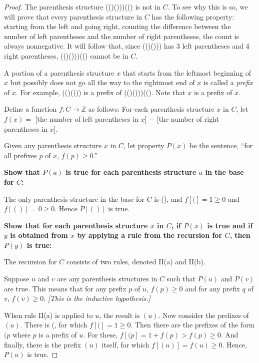 \documentclass[14pt]{extarticle}
\newcommand{\Z}{\mathbb{Z}}
\begin{document}
\begin{proof}
    The parenthesis structure (()()))(() is not in $C$. To see why this is so, we will prove that every parenthesis
    structure in $C$ has the following property: starting from the left and going right, counting the difference between
    the number of left parentheses and the number of right parentheses, the count is always nonnegative. It will
    follow that, since (()())) has 3 left parentheses and 4 right parentheses, (()()))(() cannot be in $C$.

    A portion of a parenthesis structure $x$ that starts from the leftmost beginning of $x$ but possibly does not go all
    the way to the rightmost end of $x$ is called a {\it prefix} of $x$. For example, (()())) is a prefix of (()()))((). Note that $x$ is a prefix of $x$.

    Define a function \(f: C \to \Z\) as follows: For each parenthesis structure $x$ in $C$, let \(f(x) = \)
    [the number of left parentheses in $x$] $-$ [the number of right parentheses in $x$].

    Given any parenthesis structure $x$ in $C$, let property $P(x)$ be the sentence, “for all prefixes $p$ of $x$, $f(p) \geq 0$.”

    {\bf Show that $P(a)$ is true for each parenthesis structure $a$ in the base for $C$:}

    The only parenthesis structure in the base for $C$ is (), and $f[(] = 1 \geq 0$ and $f[()] = 0 \geq 0$. Hence $P[()]$ is true.

        {\bf Show that for each parenthesis structure $x$ in $C$, if $P(x)$ is true and if $y$ is obtained from $x$ by
            applying a rule from the recursion for $C$, then $P(y)$ is true:}

    The recursion for $C$ consists of two rules, denoted II(a) and II(b).

    Suppose $u$ and $v$ are any parenthesis structures in $C$ such that $P(u)$ and $P(v)$ are true. This means that for
    any prefix $p$ of $u$, $f(p) \geq 0$ and for any prefix $q$ of $v$, $f(v) \geq 0$. {\it [This is the inductive hypothesis.]}

    When rule II(a) is applied to $u$, the result is $(u)$. Now consider the prefixes of $(u)$. There is (, for which
    \(f[(] = 1 \geq 0\). Then there are the prefixes of the form $(p$ where $p$ is a prefix of $u$. For these,
    \(f[(p] = 1 + f(p) > f(p) \geq 0\). And finally, there is the prefix $(u)$ itself, for which
    \(f[(u)] = f(u) \geq 0\). Hence, $P(u)$ is true.


\end{proof}
\end{document}
